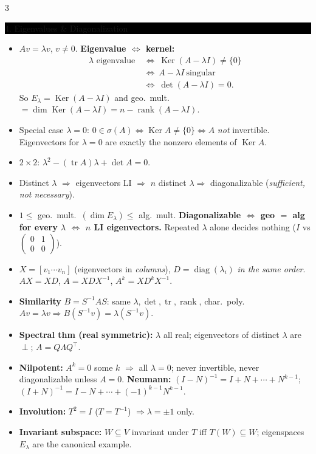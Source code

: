 \documentclass[8pt,letterpaper]{article}
\makeatletter
\newcommand{\sect}[1]{%
  \vspace{2.2pt}%
  \noindent\colorbox{black}{\parbox{\dimexpr\linewidth-2\fboxsep}{%
    \color{white}\bfseries\scshape\fontsize{6.4}{7.4}\selectfont
    \hyphenpenalty=10000\exhyphenpenalty=10000\raggedright #1}}%
  \vspace{1.4pt}\par\nopagebreak\@afterheading}
\newenvironment{tl}
  {\begin{itemize}[leftmargin=6pt,itemsep=0.3pt,topsep=1pt,parsep=0pt,
                   partopsep=0pt,label=\textcolor{gray}{\tiny$\bullet$}]}
  {\end{itemize}}
\newcommand{\tr}{\operatorname{tr}}
\newcommand{\rank}{\operatorname{rank}}
\newcommand{\Ker}{\operatorname{Ker}}
\newcommand{\tp}{^{\!\top}}
\makeatother
\begin{document}
\begin{multicols}{3}
\sect{4. Eigenvalues \& Diagonalization}
\begin{tl}
\item $Av=\lambda v$, $v\neq0$. \textbf{Eigenvalue $\iff$ kernel:}
\begin{align*}
\lambda\text{ eigenvalue}\ &\iff\ \Ker(A-\lambda I)\neq\{0\}\\
&\iff\ A-\lambda I\ \text{singular}\\
&\iff\ \det(A-\lambda I)=0.
\end{align*}
So $E_\lambda=\Ker(A-\lambda I)$ and geo.\ mult.\ $=\dim\Ker(A-\lambda I)=n-\rank(A-\lambda I)$.
\item Special case $\lambda=0$: $0\in\sigma(A)\iff\Ker A\neq\{0\}\iff A$ \emph{not} invertible. Eigenvectors for $\lambda=0$ are exactly the nonzero elements of $\Ker A$.
\item $2\times2$: $\lambda^2-(\tr A)\lambda+\det A=0$.
\item Distinct $\lambda$ $\Rightarrow$ eigenvectors LI $\Rightarrow$ $n$ distinct $\lambda\Rightarrow$ diagonalizable (\emph{sufficient, not necessary}).
\item $1\le$ geo.\ mult.\ $(\dim E_\lambda)\le$ alg.\ mult. \textbf{Diagonalizable $\iff$ geo $=$ alg for every $\lambda$ $\iff$ $n$ LI eigenvectors.} Repeated $\lambda$ alone decides nothing ($I$ vs $\left(\begin{smallmatrix}0&1\\0&0\end{smallmatrix}\right)$).
\item $X=[v_1\cdots v_n]$ (eigenvectors in \emph{columns}), $D=\operatorname{diag}(\lambda_i)$ \emph{in the same order}. $AX=XD$, $A=XDX^{-1}$, \textbf{$A^k=XD^kX^{-1}$}.
\item \textbf{Similarity} $B=S^{-1}AS$: same $\lambda,\det,\tr,\rank$, char.\ poly. $Av=\lambda v\Rightarrow B(S^{-1}v)=\lambda(S^{-1}v)$.
\item \textbf{Spectral thm (real symmetric):} $\lambda$ all real; eigenvectors of distinct $\lambda$ are $\perp$; $A=Q\Lambda Q\tp$.
\item \textbf{Nilpotent:} $A^k=0$ some $k$ $\Rightarrow$ all $\lambda=0$; never invertible, never diagonalizable unless $A=0$. \textbf{Neumann:} $(I-N)^{-1}=I+N+\cdots+N^{k-1}$; $(I+N)^{-1}=I-N+\cdots+(-1)^{k-1}N^{k-1}$.
\item \textbf{Involution:} $T^2=I$ ($T=T^{-1}$) $\Rightarrow\lambda=\pm1$ only.
\item \textbf{Invariant subspace:} $W\subseteq V$ invariant under $T$ iff $T(W)\subseteq W$; eigenspaces $E_\lambda$ are the canonical example.
\end{tl}
\vspace{\baselineskip}


\end{multicols}
\end{document}
